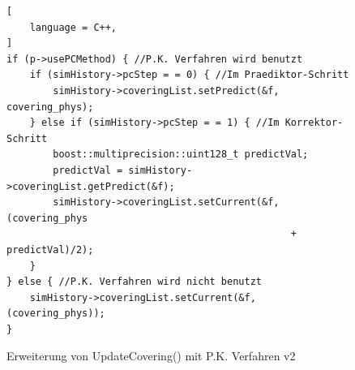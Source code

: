 \documentclass{listhesis}
\begin{document}
\begin{figure}[!h]
\centering
\begin{lstlisting}[
    language = C++,
]
if (p->usePCMethod) { //P.K. Verfahren wird benutzt
	if (simHistory->pcStep = = 0) { //Im Praediktor-Schritt
		simHistory->coveringList.setPredict(&f, covering_phys);
	} else if (simHistory->pcStep = = 1) { //Im Korrektor-Schritt
		boost::multiprecision::uint128_t predictVal;
		predictVal = simHistory->coveringList.getPredict(&f);
		simHistory->coveringList.setCurrent(&f, (covering_phys 
												 + predictVal)/2);
	}
} else { //P.K. Verfahren wird nicht benutzt	
	simHistory->coveringList.setCurrent(&f, (covering_phys));
}
\end{lstlisting}
\caption{Erweiterung von UpdateCovering() mit P.K. Verfahren v2}
\label{fig:updateCov2}
\end{figure}
\end{document}

